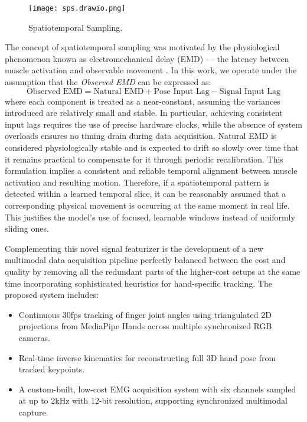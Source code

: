 \begin{figure}[H]
    \centering
    \texttt{[image: sps.drawio.png]}
    \caption{Spatiotemporal Sampling.}
    \label{fig:sps}
\end{figure}

The concept of spatiotemporal sampling was motivated by the physiological phenomenon known as electromechanical delay (EMD) — the latency between muscle activation and observable movement \cite{ngeo2014continuous}. In this work, we operate under the assumption that the \textit{Observed EMD} can be expressed as:
\[
\text{Observed EMD} = \text{Natural EMD} + \text{Pose Input Lag} - \text{Signal Input Lag}
\]
where each component is treated as a near-constant, assuming the variances introduced are relatively small and stable. In particular, achieving consistent input lags requires the use of precise hardware clocks, while the absence of system overloads ensures no timing drain during data acquisition. Natural EMD is considered physiologically stable and is expected to drift so slowly over time that it remains practical to compensate for it through periodic recalibration. This formulation implies a consistent and reliable temporal alignment between muscle activation and resulting motion. Therefore, if a spatiotemporal pattern is detected within a learned temporal slice, it can be reasonably assumed that a corresponding physical movement is occurring at the same moment in real life. This justifies the model's use of focused, learnable windows instead of uniformly sliding ones.

Complementing this novel signal featurizer is the development of a new multimodal data acquisition pipeline perfectly balanced between the cost and quality by removing all the redundant parts of the higher-cost setups at the same time incorporating sophisticated heuristics for hand-specific tracking. The proposed system includes:
\begin{itemize}
    \item Continuous 30fps tracking of finger joint angles using triangulated 2D projections from MediaPipe Hands across multiple synchronized RGB cameras.
    \item Real-time inverse kinematics for reconstructing full 3D hand pose from tracked keypoints.
    \item A custom-built, low-cost EMG acquisition system with six channels sampled at up to 2kHz with 12-bit resolution, supporting synchronized multimodal capture.
\end{itemize}

